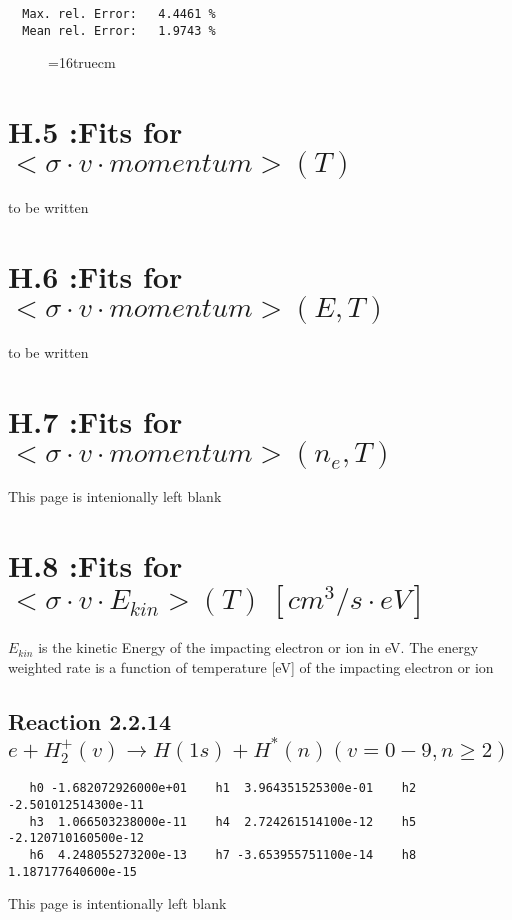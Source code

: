 \documentclass[12pt]{article}
\begin{document}
\begin{small}
\begin{verbatim}
  Max. rel. Error:   4.4461 %
  Mean rel. Error:   1.9743 %
\end{verbatim}\end{small}
\begin{figure} \label{7.2.3b}
\epsfxsize=16truecm
\end{figure}
\newpage


\section{H.5 :Fits for $<\sigma \cdot v \cdot momentum> (T) $}

to be written

\section{H.6 :Fits for $<\sigma \cdot v \cdot momentum> (E,T) $ }


to be written

\section{H.7 :Fits for $<\sigma \cdot v \cdot momentum> (n_e,T) $ }

\newpage
This page is intenionally left blank
\newpage

\section{H.8 :Fits for $<\sigma \cdot v \cdot E_{kin}> (T) \ [cm^3/s
\cdot eV]$}

$E_{kin}$ is the kinetic Energy of the impacting electron or ion in eV.
The energy weighted rate is a function of temperature [eV] of the
impacting electron or ion

\subsection{
Reaction 2.2.14   $e + H_2^+(v) \rightarrow H(1s) + H^*(n)   (v=0-9, n \ge 2) $
}



\begin{small}\begin{verbatim}
   h0 -1.682072926000e+01    h1  3.964351525300e-01    h2 -2.501012514300e-11
   h3  1.066503238000e-11    h4  2.724261514100e-12    h5 -2.120710160500e-12
   h6  4.248055273200e-13    h7 -3.653955751100e-14    h8  1.187177640600e-15

\end{verbatim}\end{small}
\newpage
This page is intentionally left blank
\newpage
\end{document}
